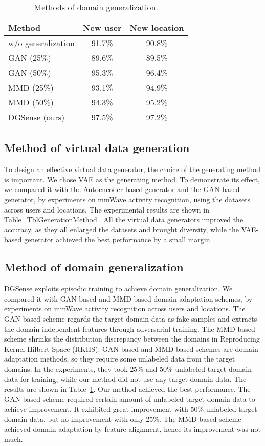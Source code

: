 \documentclass[journal]{IEEEtran}
\begin{document}
\begin{table}[h]
		\footnotesize
    \centering
		\caption{Methods of domain generalization.}
		\label{TblGeneralizationMethod}
    \begin{tabular}{p{3cm}cc}
    \hline
    Method 							& New user		& New location		\\ \hline
    w/o generalization 	& 91.7\% 			& 90.8\% 			\\ 
    GAN (25\%) 					& 89.6\% 			& 89.5\% 			\\ 
    GAN (50\%) 					& 95.3\% 			& 96.4\% 			\\ 
    MMD (25\%) 					& 93.1\% 			& 94.9\% 			\\ 
    MMD (50\%) 					& 94.3\% 			& 95.2\% 			\\ 
    DGSense (ours) 			& 97.5\% 			& 97.2\% 			\\ 		\hline
    \end{tabular}
\end{table}

\subsection{Method of virtual data generation}
To design an effective virtual data generator, the choice of the generating method is important. We chose VAE as the generating method. To demonstrate its effect, we compared it with the Autoencoder-based generator and the GAN-based generator, by experiments on mmWave activity recognition, using the datasets across users and locations. The experimental results are shown in Table~\ref{TblGenerationMethod}. All the virtual data generators improved the accuracy, as they all enlarged the datasets and brought diversity, while the VAE-based generator achieved the best performance by a small margin.

\subsection{Method of domain generalization}
DGSense exploits episodic training to achieve domain generalization. We compared it with GAN-based and MMD-based domain adaptation schemes, by experiments on mmWave activity recognition across users and locations. The GAN-based scheme regards the target domain data as fake samples and extracts the domain independent features through adversarial training. The MMD-based scheme shrinks the distribution discrepancy between the domains in Reproducing Kernel Hilbert Space (RKHS). GAN-based and MMD-based schemes are domain adaptation methods, so they require some unlabeled data from the target domains. In the experiments, they took 25\% and 50\% unlabeled target domain data for training, while our method did not use any target domain data. The results are shown in Table~\ref{TblGeneralizationMethod}. Our method achieved the best performance. The GAN-based scheme required certain amount of unlabeled target domain data to achieve improvement. It exhibited great improvement with 50\% unlabeled target domain data, but no improvement with only 25\%. The MMD-based scheme achieved domain adaptation by feature alignment, hence its improvement was not much. 
\end{document}
